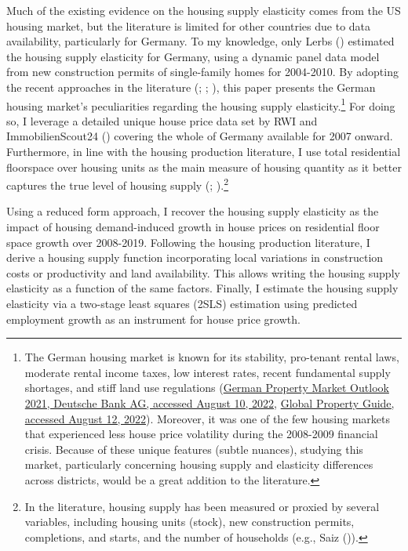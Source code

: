 \documentclass[
  12pt,
]{article}
\begin{document}
Much of the existing evidence on the housing supply elasticity comes from the US housing market, but the literature is limited for other countries due to data availability, particularly for Germany. To my knowledge, only Lerbs () estimated the housing supply elasticity for Germany, using a dynamic panel data model from new construction permits of single-family homes for 2004-2010. By adopting the recent approaches in the literature (; ; ), this paper presents the German housing market's peculiarities regarding the housing supply elasticity.\footnote{The German housing market is known for its stability, pro-tenant rental laws, moderate rental income taxes, low interest rates, recent fundamental supply shortages, and stiff land use regulations (\href{https://www.dbresearch.com/PROD/RPS_EN-PROD/PROD0000000000517463/Outlook_for_the_German_residential_property_market.pdf?undefined&realload=OGCzKhorommVYqr3DKzCKCT/4~0T75BVVmGs5XHbQs3QdBI~xyjvWG3i2CAeU6MJ}{German Property Market Outlook 2021, Deutsche Bank AG, accessed August 10, 2022}, \href{https://www.globalpropertyguide.com/Europe/Germany}{Global Property Guide, accessed August 12, 2022}). Moreover, it was one of the few housing markets that experienced less house price volatility during the 2008-2009 financial crisis. Because of these unique features (subtle nuances), studying this market, particularly concerning housing supply and elasticity differences across districts, would be a great addition to the literature.} For doing so, I leverage a detailed unique house price data set by RWI and ImmobilienScout24 () covering the whole of Germany available for 2007 onward. Furthermore, in line with the housing production literature, I use total residential floorspace over housing units as the main measure of housing quantity as it better captures the true level of housing supply (; ).\footnote{In the literature, housing supply has been measured or proxied by several variables, including housing units (stock), new construction permits, completions, and starts, and the number of households (e.g., Saiz ()).}

Using a reduced form approach, I recover the housing supply elasticity as the impact of housing demand-induced growth in house prices on residential floor space growth over 2008-2019. Following the housing production literature, I derive a housing supply function incorporating local variations in construction costs or productivity and land availability. This allows writing the housing supply elasticity as a function of the same factors. Finally, I estimate the housing supply elasticity via a two-stage least squares (2SLS) estimation using predicted employment growth as an instrument for house price growth.
\end{document}
